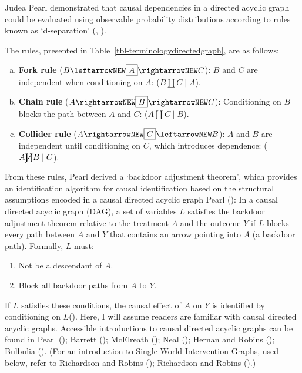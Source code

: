 \documentclass[
  single column]{article}
\providecommand{\tightlist}{%
  \setlength{\itemsep}{0pt}\setlength{\parskip}{0pt}}\usepackage{longtable,booktabs,array}
\begin{document}
Judea Pearl demonstrated that causal dependencies in a directed acyclic
graph could be evaluated using observable probability distributions
according to rules known as `d-separation'
(, ).

The rules, presented in Table~\ref{tbl-terminologydirectedgraph}, are as
follows:

\begin{enumerate}[a)]
     \item  {\bf Fork rule} ($B \leftarrowNEW \boxed{A} \rightarrowNEW C$): $B$ and $C$ are independent when conditioning on $A$: ($B \coprod C \mid A$).
     \item  {\bf Chain rule} ($A \rightarrowNEW \boxed{B} \rightarrowNEW C$): Conditioning on $B$ blocks the path between $A$ and $C$: ($A \coprod C \mid B$).
     \item  {\bf Collider rule} ($A \rightarrowNEW \boxed{C} \leftarrowNEW B$): $A$ and $B$ are independent until conditioning on $C$, which introduces dependence: ($A \cancel{\coprod} B \mid C$). 
 \end{enumerate}

From these rules, Pearl derived a `backdoor adjustment theorem', which
provides an identification algorithm for causal identification based on
the structural assumptions encoded in a causal directed acyclic graph
Pearl (): In a causal directed acyclic
graph (DAG), a set of variables \(L\) satisfies the backdoor adjustment
theorem relative to the treatment \(A\) and the outcome \(Y\) if \(L\)
blocks every path between \(A\) and \(Y\) that contains an arrow
pointing into \(A\) (a backdoor path). Formally, \(L\) must:

\begin{enumerate}
\def\labelenumi{\arabic{enumi}.}
\tightlist
\item
  Not be a descendant of \(A\).
\item
  Block all backdoor paths from \(A\) to \(Y\).
\end{enumerate}

If \(L\) satisfies these conditions, the causal effect of \(A\) on \(Y\)
is identified by conditioning on
\(\boxed{L}\)(). Here, I will
assume readers are familiar with causal directed acyclic graphs.
Accessible introductions to causal directed acyclic graphs can be found
in Pearl (); Barrett
(); McElreath
(); Neal
(); Hernan and Robins
(); Bulbulia
(). (For an introduction to Single
World Intervention Graphs, used below, refer to Richardson and Robins
(); Richardson and Robins
().)
\end{document}
